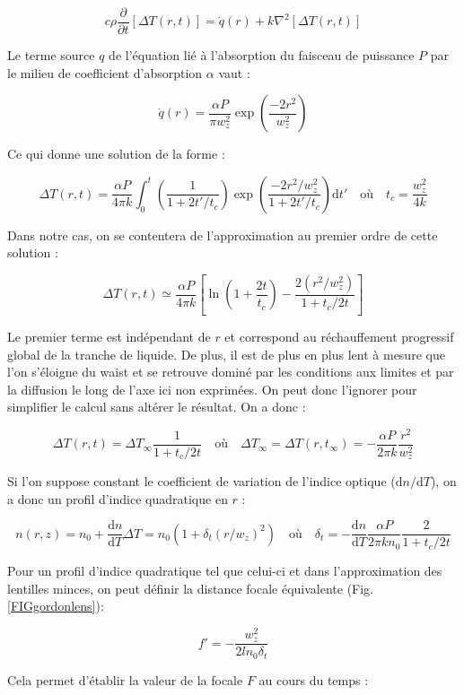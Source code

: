 $$
c\rho\frac{\partial}{\partial t}[\Delta T(r,t)] = \dot{q}(r) + k \nabla^2[\Delta T(r,t)]
$$

Le terme source $q$ de l'équation lié à l'absorption du faisceau de puissance $P$ par le milieu de coefficient d'absorption $\alpha$ vaut \cite{gordon_longtransient_1965} :

$$
\dot{q}(r) = \frac{\alpha P}{\pi w^2_z}\exp \left(\frac{-2r^2}{w^2_z} \right)
$$

Ce qui donne une solution de la forme \cite{gordon_longtransient_1965} :

$$
\Delta T(r,t) = \frac{\alpha P}{4\pi k} \int_0^t \left( \frac{1}{1+2t'/t_c} \right) \exp \left( \frac{-2r^2/w_z^2}{1+2t'/t_c} \right) \mathrm{d}t'
\quad \text{où} \quad
t_c = \frac{w_z^2}{4k}
$$

Dans notre cas, on se contentera de l'approximation au premier ordre de cette solution \cite{gordon_longtransient_1965} :

$$
\Delta T(r,t) \simeq \frac{\alpha P}{4\pi k} \left[ \ln\left( 1+\frac{2t}{t_c} \right) - \frac{2(r^2/w_z^2)}{1+t_c/2t} \right]
$$

Le premier terme est indépendant de $r$ et correspond au réchauffement progressif global de la tranche de liquide. De plus, il est de plus en plus lent à mesure que l'on s'éloigne du waist et se retrouve dominé par les conditions aux limites et par la diffusion le long de l'axe ici non exprimées. On peut donc l'ignorer \cite{gordon_longtransient_1965} pour simplifier le calcul sans altérer le résultat. On a donc :

$$
\Delta T(r,t) = \Delta T_\infty \frac{1}{1+t_c/2t}
\quad \text{où} \quad
\Delta T_\infty = \Delta T(r,t_\infty) = -\frac{\alpha P}{2\pi k}\frac{r^2}{w_z^2}
$$


Si l'on suppose constant le coefficient de variation de l'indice optique ($\mathrm{d}n/\mathrm{d}T$), on a donc un profil d'indice quadratique en $r$ :

$$
n(r,z) = n_0 + \frac{\mathrm{d}n}{\mathrm{d}T}\Delta T = n_0 \left( 1+ \delta_t (r/w_z)^2 \right)
\quad \text{où} \quad
\delta_t = - \frac{\mathrm{d}n}{\mathrm{d}T} \frac{\alpha P}{2\pi kn_0} \frac{2}{1+t_c/2t}
$$

Pour un profil d'indice quadratique tel que celui-ci et dans l'approximation des lentilles minces, on peut définir la distance focale équivalente (Fig. \ref{FIGgordonlens}):

$$
f' = -\frac{w^2_z}{2ln_0\delta_t}
$$

Cela permet d'établir la valeur de la focale $F$ au cours du temps :

